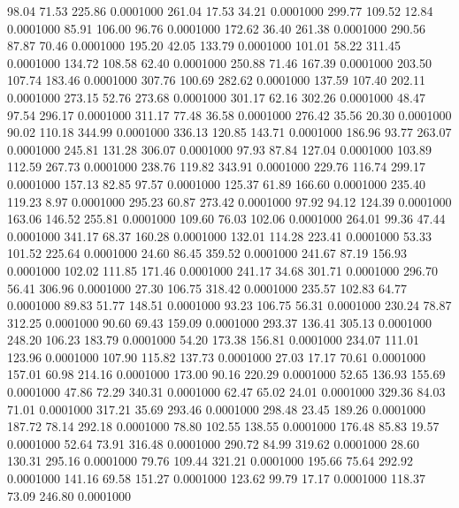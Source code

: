   98.04   71.53  225.86   0.0001000
 261.04   17.53   34.21   0.0001000
 299.77  109.52   12.84   0.0001000
  85.91  106.00   96.76   0.0001000
 172.62   36.40  261.38   0.0001000
 290.56   87.87   70.46   0.0001000
 195.20   42.05  133.79   0.0001000
 101.01   58.22  311.45   0.0001000
 134.72  108.58   62.40   0.0001000
 250.88   71.46  167.39   0.0001000
 203.50  107.74  183.46   0.0001000
 307.76  100.69  282.62   0.0001000
 137.59  107.40  202.11   0.0001000
 273.15   52.76  273.68   0.0001000
 301.17   62.16  302.26   0.0001000
  48.47   97.54  296.17   0.0001000
 311.17   77.48   36.58   0.0001000
 276.42   35.56   20.30   0.0001000
  90.02  110.18  344.99   0.0001000
 336.13  120.85  143.71   0.0001000
 186.96   93.77  263.07   0.0001000
 245.81  131.28  306.07   0.0001000
  97.93   87.84  127.04   0.0001000
 103.89  112.59  267.73   0.0001000
 238.76  119.82  343.91   0.0001000
 229.76  116.74  299.17   0.0001000
 157.13   82.85   97.57   0.0001000
 125.37   61.89  166.60   0.0001000
 235.40  119.23    8.97   0.0001000
 295.23   60.87  273.42   0.0001000
  97.92   94.12  124.39   0.0001000
 163.06  146.52  255.81   0.0001000
 109.60   76.03  102.06   0.0001000
 264.01   99.36   47.44   0.0001000
 341.17   68.37  160.28   0.0001000
 132.01  114.28  223.41   0.0001000
  53.33  101.52  225.64   0.0001000
  24.60   86.45  359.52   0.0001000
 241.67   87.19  156.93   0.0001000
 102.02  111.85  171.46   0.0001000
 241.17   34.68  301.71   0.0001000
 296.70   56.41  306.96   0.0001000
  27.30  106.75  318.42   0.0001000
 235.57  102.83   64.77   0.0001000
  89.83   51.77  148.51   0.0001000
  93.23  106.75   56.31   0.0001000
 230.24   78.87  312.25   0.0001000
  90.60   69.43  159.09   0.0001000
 293.37  136.41  305.13   0.0001000
 248.20  106.23  183.79   0.0001000
  54.20  173.38  156.81   0.0001000
 234.07  111.01  123.96   0.0001000
 107.90  115.82  137.73   0.0001000
  27.03   17.17   70.61   0.0001000
 157.01   60.98  214.16   0.0001000
 173.00   90.16  220.29   0.0001000
  52.65  136.93  155.69   0.0001000
  47.86   72.29  340.31   0.0001000
  62.47   65.02   24.01   0.0001000
 329.36   84.03   71.01   0.0001000
 317.21   35.69  293.46   0.0001000
 298.48   23.45  189.26   0.0001000
 187.72   78.14  292.18   0.0001000
  78.80  102.55  138.55   0.0001000
 176.48   85.83   19.57   0.0001000
  52.64   73.91  316.48   0.0001000
 290.72   84.99  319.62   0.0001000
  28.60  130.31  295.16   0.0001000
  79.76  109.44  321.21   0.0001000
 195.66   75.64  292.92   0.0001000
 141.16   69.58  151.27   0.0001000
 123.62   99.79   17.17   0.0001000
 118.37   73.09  246.80   0.0001000
